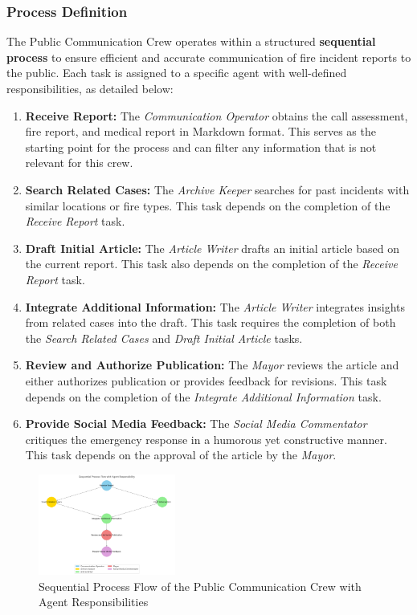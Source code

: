 \subsubsection{Process Definition}

The Public Communication Crew operates within a structured \textbf{sequential process} to ensure efficient and accurate communication of fire incident reports to the public. Each task is assigned to a specific agent with well-defined responsibilities, as detailed below:

\begin{enumerate}
	\item \textbf{Receive Report:} The \textit{Communication Operator} obtains the call assessment, fire report, and medical report in Markdown format. This serves as the starting point for the process and can filter any information that is not relevant for this crew.
	\item \textbf{Search Related Cases:} The \textit{Archive Keeper} searches for past incidents with similar locations or fire types. This task depends on the completion of the \textit{Receive Report} task.
	\item \textbf{Draft Initial Article:} The \textit{Article Writer} drafts an initial article based on the current report. This task also depends on the completion of the \textit{Receive Report} task.
	\item \textbf{Integrate Additional Information:} The \textit{Article Writer} integrates insights from related cases into the draft. This task requires the completion of both the \textit{Search Related Cases} and \textit{Draft Initial Article} tasks.
	\item \textbf{Review and Authorize Publication:} The \textit{Mayor} reviews the article and either authorizes publication or provides feedback for revisions. This task depends on the completion of the \textit{Integrate Additional Information} task.
	\item \textbf{Provide Social Media Feedback:} The \textit{Social Media Commentator} critiques the emergency response in a humorous yet constructive manner. This task depends on the approval of the article by the \textit{Mayor}.
\end{enumerate}

\begin{figure}[ht!]
	\centering
	\includegraphics[width=0.4\textwidth]{figures/PC-process.png}
	\caption{Sequential Process Flow of the Public Communication Crew with Agent Responsibilities}
	\label{fig:public_comm_flow}
\end{figure}



